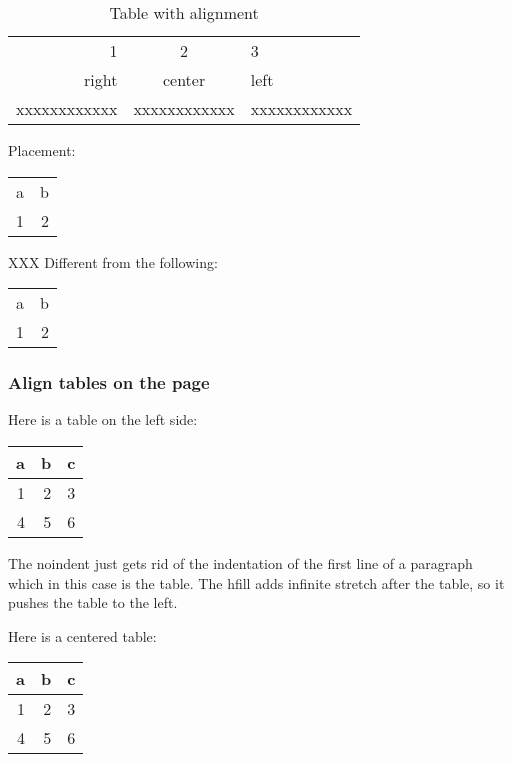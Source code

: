 \documentclass[11pt]{article}
\begin{document}
\begin{table}[htbp]
\caption{Table with alignment}
\centering
\begin{tabular}{rcl}
1 & 2 & 3\\[0pt]
right & center & left\\[0pt]
xxxxxxxxxxxx & xxxxxxxxxxxx & xxxxxxxxxxxx\\[0pt]
\end{tabular}
\end{table}

Placement:

\begin{tabular}{rr}
a & b\\[0pt]
1 & 2\\[0pt]
\end{tabular}

XXX
Different from the following:

\begin{center}
\begin{tabular}{rr}
a & b\\[0pt]
1 & 2\\[0pt]
\end{tabular}
\end{center}

\subsubsection*{Align tables on the page}
\label{sec:org4550c3d}

Here is a table on the left side:

\noindent
\begin{tabular}{rrr}
a & b & c\\[0pt]
\hline
1 & 2 & 3\\[0pt]
4 & 5 & 6\\[0pt]
\end{tabular}
\hfill

The noindent just gets rid of the indentation of the first line of a paragraph
which in this case is the table. The hfill adds infinite stretch after the
table, so it pushes the table to the left.

Here is a centered table:

\begin{center}
\begin{tabular}{rrr}
a & b & c\\[0pt]
\hline
1 & 2 & 3\\[0pt]
4 & 5 & 6\\[0pt]
\end{tabular}
\end{center}
\end{document}
